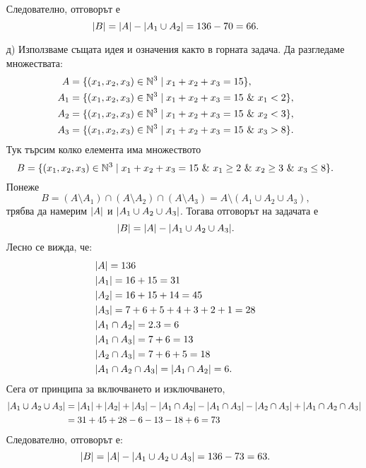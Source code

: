 \begin{solution}
\begin{enumerate}[a)]
    Следователно, отговорът е 
    \[\lvert{B}\rvert = \lvert{A}\rvert - \lvert{A_1 \cup A_2}\rvert = 136 - 70 = 66.\]
  \item[д)]
    Използваме същата идея и означения както в горната задача.
    Да разгледаме множествата:
    \begin{align*}
      A & = \{(x_1,x_2,x_3) \in \Nat^3\mid x_1 + x_2 + x_3 = 15\},\\
      A_1 & = \{(x_1,x_2,x_3) \in \Nat^3\mid x_1 + x_2 + x_3 = 15\ \&\ x_1 < 2\},\\
      A_2 & = \{(x_1,x_2,x_3) \in \Nat^3\mid x_1 + x_2 + x_3 = 15\ \&\ x_2 < 3\},\\
      A_3 & = \{(x_1,x_2,x_3) \in \Nat^3\mid x_1 + x_2 + x_3 = 15\ \&\ x_3 > 8\}.
    \end{align*}
    Тук търсим колко елемента има множеството
    \[B = \{(x_1,x_2,x_3) \in \mathbb{N}^3\mid x_1 + x_2 + x_3 = 15\ \&\ x_1 \geq 2\ \&\ x_2 \geq 3\ \&\ x_3 \leq 8\}.\]
    Понеже
    \[B = (A \setminus A_1) \cap (A\setminus A_2) \cap (A\setminus A_3) = A \setminus (A_1 \cup A_2 \cup A_3),\]
    трябва да намерим $\lvert{A}\rvert$ и $\lvert{A_1 \cup A_2 \cup A_3}\rvert$.
    Тогава отговорът на задачата е 
    \[\lvert{B}\rvert = \lvert{A}\rvert - \lvert{A_1 \cup A_2 \cup A_3}\rvert.\]
    Лесно се вижда, че:
    \begin{align*}
      & \lvert{A}\rvert  = 136\\
      & \lvert{A_1}\rvert = 16 + 15 = 31\\
      & \lvert{A_2}\rvert = 16 + 15 + 14 = 45\\
      & \lvert{A_3}\rvert = 7 + 6 + 5 + 4 + 3 + 2 + 1 = 28\\
      & \lvert{A_1\cap A_2}\rvert = 2.3 = 6\\
      & \lvert{A_1\cap A_3}\rvert  = 7 + 6 = 13\\
      & \lvert{A_2\cap A_3}\rvert  = 7 + 6 + 5 = 18\\
      & \lvert{A_1\cap A_2\cap A_3}\rvert = \lvert{A_1 \cap A_2}\rvert = 6.
    \end{align*}
    Сега от принципа за включването и изключването, 
    \begin{align*}
      \lvert{A_1 \cup A_2 \cup A_3}\rvert & = \lvert{A_1}\rvert + \lvert{A_2}\rvert + \lvert{A_3}\rvert - \lvert{A_1 \cap A_2}\rvert - \lvert{A_1 \cap A_3}\rvert - \lvert{A_2 \cap A_3}\rvert + \lvert{A_1 \cap A_2 \cap A_3}\rvert\\
      & = 31 + 45 + 28 - 6 - 13 - 18 + 6 = 73
    \end{align*}
    Следователно, отговорът е:
    \[\lvert{B}\rvert = \lvert{A}\rvert - \lvert{A_1\cup A_2 \cup A_3}\rvert = 136 - 73 = 63.\]
  \end{enumerate}
\end{solution}


